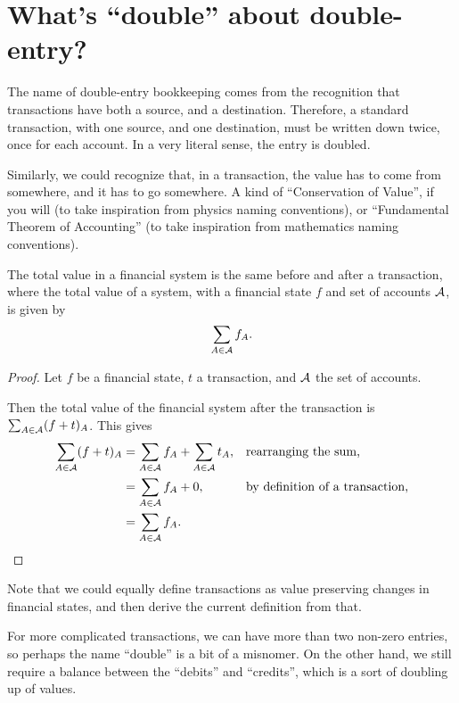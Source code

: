 \section{What's ``double'' about double-entry?}

The name of double-entry bookkeeping comes from the recognition that transactions have both a source, and a destination.
Therefore, a standard transaction, with one source, and one destination, must be written down twice, once for each account.
In a very literal sense, the entry is doubled.

Similarly, we could recognize that, in a transaction, the value has to come from somewhere, and it has to go somewhere.
A kind of ``Conservation of Value'', if you will (to take inspiration from physics naming conventions),
or ``Fundamental Theorem of Accounting'' (to take inspiration from mathematics naming conventions).\footnotemark
{}

\begin{theorem}
    The total value in a financial system is the same before and after a transaction,
    where the total value of a system, with a financial state $f$ and set of accounts $\mathcal{A}$, is given by
    \begin{equation*}
        \sum_{A \in \mathcal{A}} f_A.
    \end{equation*}
\end{theorem}

\begin{proof}
    Let $f$ be a financial state, $t$ a transaction, and $\mathcal{A}$ the set of accounts.

    Then the total value of the financial system after the transaction is $\sum_{A \in \mathcal{A}} (f + t)_A$.
    This gives
    \begin{align*}
        \sum_{A \in \mathcal{A}} (f + t)_A &= \sum_{A \in \mathcal{A}} f_A + \sum_{A \in \mathcal{A}} t_A, && \text{rearranging the sum,} \\
        &= \sum_{A \in \mathcal{A}} f_A + 0, && \text{by definition of a transaction,} \\
        &= \sum_{A \in \mathcal{A}} f_A.
    \end{align*}
\end{proof}

Note that we could equally define transactions as value preserving changes in financial states,
and then derive the current definition from that.

For more complicated transactions, we can have more than two non-zero entries,
so perhaps the name ``double'' is a bit of a misnomer.
On the other hand, we still require a balance between the ``debits'' and ``credits'', which is a sort of doubling up of values.
